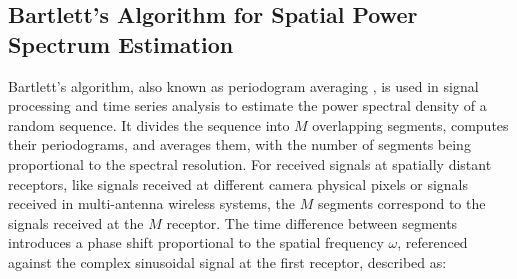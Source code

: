 \subsection{Bartlett's Algorithm for Spatial Power Spectrum Estimation}
Bartlett's algorithm, also known as periodogram averaging \cite{Bartlett1948}, is used in signal processing and time series analysis to estimate the power spectral density of a random sequence. It divides the sequence into \( M \) overlapping segments, computes their periodograms, and averages them, with the number of segments being proportional to the spectral resolution. For received signals at spatially distant receptors, like signals received at different camera physical pixels or signals received in multi-antenna wireless systems, the $M$ segments correspond to the signals received at the $M$ receptor. The time difference between segments introduces a phase shift proportional to the spatial frequency \(\omega\), referenced against the complex sinusoidal signal at the first receptor\cite{AoA}, described as:

